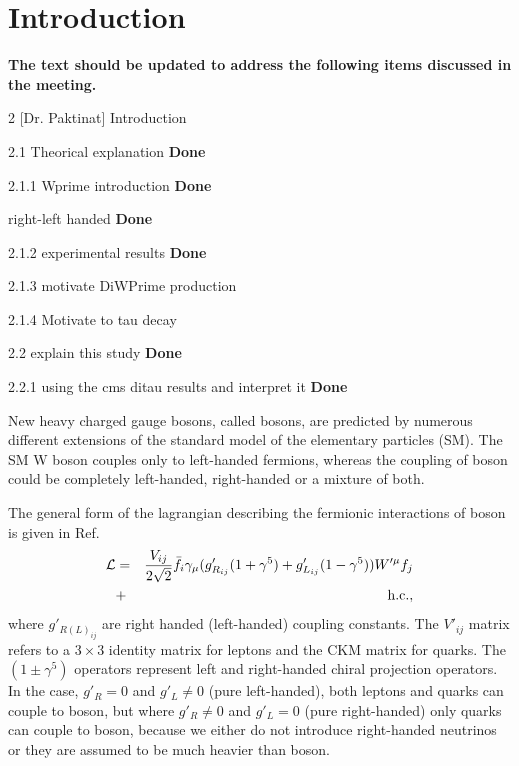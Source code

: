
\section{Introduction}\label{sec:int} 


{\bf The text should be updated to address the following items discussed in the meeting.}

2 [Dr. Paktinat] Introduction 

2.1 Theorical explanation {\bf Done}

2.1.1 Wprime introduction {\bf Done}

right-left handed {\bf Done}

2.1.2 experimental results {\bf Done}

2.1.3 motivate DiWPrime production

2.1.4 Motivate to tau decay

2.2 explain this study {\bf Done}

2.2.1 using the cms ditau results and interpret it {\bf Done}




New heavy charged gauge bosons, called \wprime bosons, are predicted by numerous different extensions of the standard model of the elementary particles (SM). 
The SM W boson couples only to left-handed fermions, whereas the coupling of \wprime boson could be completely left-handed, right-handed or a mixture of both. 

The general form of the lagrangian describing the fermionic interactions of \wprime boson is given in  Ref.~\cite{Sullivan:2002jt}
\begin{eqnarray}
{\cal L}& =& \frac{V_{ij}}{2\sqrt{2}}\bar{f_i} \gamma_{\mu}(g^\prime_{R_{ij}} (1+{\gamma}^5)+
g^\prime_{L_{ij}}
(1-{\gamma}^5)) W^{\prime \mu} f_j  \nonumber\\
&+& \mathrm{h.c.},
\end{eqnarray}
where $g'_{R(L)_{ij}}$ are right handed (left-handed) coupling constants. The $V'_{ij}$ matrix refers to a $3\times3$ identity matrix for leptons and the CKM matrix for quarks. The $(1\pm{\gamma^5})$ operators represent left and right-handed chiral projection operators. In the case, $g'_R = 0$ and $g'_L \neq 0$ (pure left-handed), both leptons and quarks can couple to \wprime boson, but where $g'_R \neq 0$ and $g'_L = 0$ (pure right-handed) only quarks can couple to \wprime boson, because we either do not introduce right-handed neutrinos or they are assumed to be much heavier than \wprime boson. 

